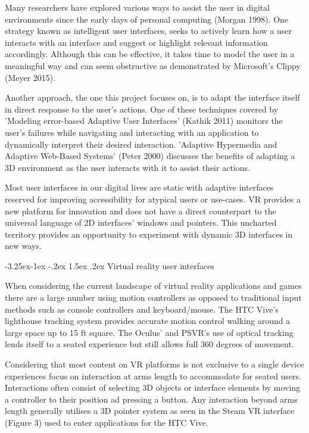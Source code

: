 \documentclass[12pt]{article}
\makeatletter
\renewcommand{\subsection}{\@startsection{subsection}{2}{\z@}%
             {-3.25ex\@plus -1ex \@minus -.2ex}%
             {1.5ex \@plus .2ex}%
             {\normalfont\large\scshape\bfseries}}
\makeatother
\begin{document}
Many researchers have explored various ways to assist the user in digital environments since the early days of personal computing (Morgan 1998). One strategy known as intelligent user interfaces, seeks to actively learn how a user interacts with an interface and suggest or highlight relevant information accordingly. Although this can be effective, it takes time to model the user in a meaningful way and can seem obstructive as demonstrated by Microsoft's Clippy (Meyer 2015).

Another approach, the one this project focuses on, is to adapt the interface itself in direct response to the user's actions. One of these techniques covered by 'Modeling error-based Adaptive User Interfaces' (Kathik 2011) monitors the user's failures while navigating and interacting with an application to dynamically interpret their desired interaction. 'Adaptive Hypermedia and Adaptive Web-Based Systems' (Peter 2000) discusses the benefits of adapting a 3D environment as the user interacts with it to assist their actions.

Most user interfaces in our digital lives are static with adaptive interfaces reserved for improving accessibility for atypical users or use-cases. VR provides a new platform for innovation and does not have a direct counterpart to the universal language of 2D interfaces' windows and pointers. This uncharted territory provides an opportunity to experiment with dynamic 3D interfaces in new ways.

\subsection{Virtual reality user interfaces}

When considering the current landscape of virtual reality applications and games there are a large number using motion controllers as opposed to traditional input methods such as console controllers and keyboard/mouse. The HTC Vive's lighthouse tracking system provides accurate motion control walking around a large space up to 15 ft square. The Oculus' and PSVR's use of optical tracking lends itself to a seated experience but still allows full 360 degrees of movement. 

Considering that most content on VR platforms is not exclusive to a single device experiences focus on interaction at arms length to accommodate for seated users. Interactions often consist of selecting 3D objects or interface elements by moving a controller to their position ad pressing a button. Any interaction beyond arms length generally utilises a 3D pointer system as seen in the Steam VR interface (Figure 3) used to enter applications for the HTC Vive.
\end{document}

